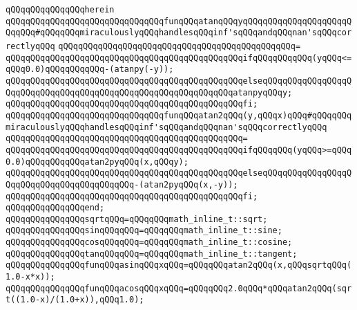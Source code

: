 \newline
\verb|qQQqqQQqqQQqqQQqherein|\newline
\newline
\verb|qQQqqQQqqQQqqQQqqQQqqQQqqQQqqQQqfunqQQqatanqQQqyqQQqqQQqqQQqqQQqqQQqqQQqqQQq#qQQqqQQqmiraculouslyqQQqhandlesqQQqinf'sqQQqandqQQqnan'sqQQqcorrectlyqQQq|\newline
\verb|qQQqqQQqqQQqqQQqqQQqqQQqqQQqqQQqqQQqqQQqqQQqqQQq=|\newline
\verb|qQQqqQQqqQQqqQQqqQQqqQQqqQQqqQQqqQQqqQQqqQQqqQQqifqQQqqQQqqQQq(yqQQq<=qQQq0.0)qQQqqQQqqQQq-(atanpy(-y));|\newline
\verb|qQQqqQQqqQQqqQQqqQQqqQQqqQQqqQQqqQQqqQQqqQQqqQQqelseqQQqqQQqqQQqqQQqqQQqqQQqqQQqqQQqqQQqqQQqqQQqqQQqqQQqqQQqqQQqqQQqatanpyqQQqy;|\newline
\verb|qQQqqQQqqQQqqQQqqQQqqQQqqQQqqQQqqQQqqQQqqQQqqQQqfi;|\newline
\newline
\verb|qQQqqQQqqQQqqQQqqQQqqQQqqQQqqQQqfunqQQqatan2qQQq(y,qQQqx)qQQq#qQQqqQQqmiraculouslyqQQqhandlesqQQqinf'sqQQqandqQQqnan'sqQQqcorrectlyqQQq|\newline
\verb|qQQqqQQqqQQqqQQqqQQqqQQqqQQqqQQqqQQqqQQqqQQqqQQq=|\newline
\verb|qQQqqQQqqQQqqQQqqQQqqQQqqQQqqQQqqQQqqQQqqQQqqQQqifqQQqqQQq(yqQQq>=qQQq0.0)qQQqqQQqqQQqatan2pyqQQq(x,qQQqy);|\newline
\verb|qQQqqQQqqQQqqQQqqQQqqQQqqQQqqQQqqQQqqQQqqQQqqQQqelseqQQqqQQqqQQqqQQqqQQqqQQqqQQqqQQqqQQqqQQqqQQq-(atan2pyqQQq(x,-y));|\newline
\verb|qQQqqQQqqQQqqQQqqQQqqQQqqQQqqQQqqQQqqQQqqQQqqQQqfi;|\newline
\verb|qQQqqQQqqQQqqQQqend;|\newline
\newline
\newline
\verb|qQQqqQQqqQQqqQQqsqrtqQQq=qQQqqQQqmath_inline_t::sqrt;|\newline
\verb|qQQqqQQqqQQqqQQqsinqQQqqQQq=qQQqqQQqmath_inline_t::sine;|\newline
\verb|qQQqqQQqqQQqqQQqcosqQQqqQQq=qQQqqQQqmath_inline_t::cosine;|\newline
\verb|qQQqqQQqqQQqqQQqtanqQQqqQQq=qQQqqQQqmath_inline_t::tangent;|\newline
\newline
\verb|qQQqqQQqqQQqqQQqfunqQQqasinqQQqxqQQq=qQQqqQQqatan2qQQq(x,qQQqsqrtqQQq(1.0-x*x));|\newline
\verb|qQQqqQQqqQQqqQQqfunqQQqacosqQQqxqQQq=qQQqqQQq2.0qQQq*qQQqatan2qQQq(sqrt((1.0-x)/(1.0+x)),qQQq1.0);|\newline
